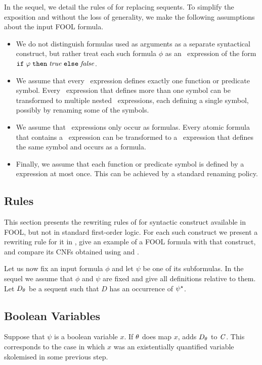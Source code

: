 In the sequel, we detail the rules of \nfcnf{} for replacing sequents. To simplify the exposition and without the loss of generality, we make the following assumptions about the input FOOL formula.
\begin{itemize}
\item
We do not distinguish formulas used as arguments as a separate syntactical construct, but rather treat each such formula $\phi$ as an \ITE\ expression of the form $\mathtt{if}\;{\varphi}\;\allowbreak\mathtt{then}\;{\mathit{true}}\;\allowbreak\mathtt{else}\;{\mathit{false}}$. 
\item
We assume that every \LETIN\ expression defines exactly one function or predicate symbol.
%
Every \LETIN\ expression that defines more than one symbol can be transformed to multiple nested \LETIN\ expressions,
each defining a single symbol, possibly by renaming some of the symbols. 
\item
We assume that \LETIN\ expressions only occur as formulas. 
%
Every atomic formula that contains a \LETIN\ expression can be transformed to a \LETIN\ expression that defines the same symbol and occurs as a formula. 
\item
Finally, we assume that each function or predicate symbol is defined by a \LETIN{} expression at most once. 
%
This can be achieved by a standard renaming policy.
\end{itemize}

\subsection{\nfcnf{} Rules}
This section presents the rewriting rules of \nfcnf{} for syntactic construct available in FOOL, but not in standard first-order logic. For each such construct we present a rewriting rule for it in \nfcnf{}, give an example of a FOOL formula with that construct, and compare its CNFs obtained using \nfcnf{} and \oldcnf{}.

Let us now fix an input formula $\phi$ and let $\psi$ be one of its subformulas. 
In the sequel we assume that $\phi$ and $\psi$ are fixed and give all definitions relative to them. 
Let ${D}_{\theta}$ be a sequent such that $D$ has an occurrence of ${\psi}^{\star}$. 

\subsection*{Boolean Variables}
Suppose that $\psi$ is a boolean variable $x$. 
If $\theta$ does map $x$, \nfcnf{} adds ${D}_{\theta}$ to $\mathit{C}$.
This corresponds to the case in which $x$ was an existentially quantified variable skolemised in some previous step.
        
